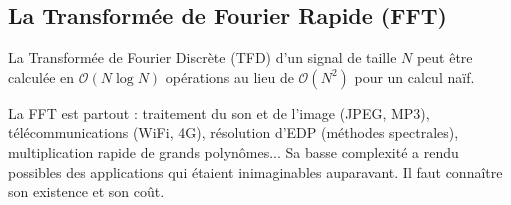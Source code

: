 \subsection{La Transformée de Fourier Rapide (FFT)}

\begin{theorem}
    La Transformée de Fourier Discrète (TFD) d'un signal de taille $N$ peut être calculée en $\mathcal{O}(N \log N)$ opérations au lieu de $\mathcal{O}(N^2)$ pour un calcul naïf.
\end{theorem}
\begin{remark}
    La FFT est partout : traitement du son et de l'image (JPEG, MP3), télécommunications (WiFi, 4G), résolution d'EDP (méthodes spectrales), multiplication rapide de grands polynômes... Sa basse complexité a rendu possibles des applications qui étaient inimaginables auparavant. Il faut connaître son existence et son coût.
\end{remark}